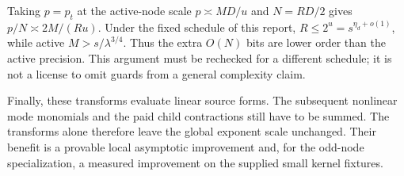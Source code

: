 Taking $p=p_t$ at the active-node scale $p\asymp MD/u$ and $N=RD/2$ gives
$p/N\asymp 2M/(Ru)$. Under the fixed schedule of this report,
$R\le2^u=s^{\eta_d+o(1)}$, while active $M>s/\lambda^{3/4}$.
Thus the extra $O(N)$ bits are lower order than the active precision.
This argument must be rechecked for a different schedule; it is not a
license to omit guards from a general complexity claim.

Finally, these transforms evaluate linear source forms. The subsequent
nonlinear mode monomials and the paid child contractions still have to be
summed. The transforms alone therefore leave the global exponent scale
unchanged. Their benefit is a provable local asymptotic improvement and,
for the odd-node specialization, a measured improvement on the supplied
small kernel fixtures.

